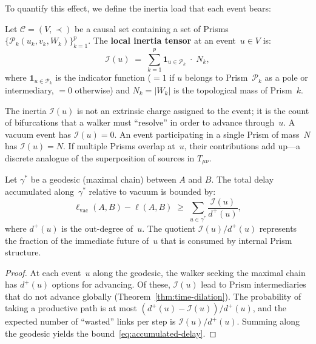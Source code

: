 To quantify this effect, we define the inertia load that each event
bears:

\begin{definition}
\label{def:inertia-tensor}
Let $\mathcal{C} = (V, \prec)$ be a causal set containing a set of
Prisms
$\{\mathcal{P}_k(u_k, v_k, W_k)\}_{k=1}^{p}$. The \textbf{local
inertia tensor} at an event~$u \in V$ is:
\begin{equation}
  \mathcal{I}(u)
  \;=\;
  \sum_{k=1}^{p} \mathbf{1}_{u \in \mathcal{P}_k} \;\cdot\; N_k,
  \label{eq:inertia-tensor}
\end{equation}
where $\mathbf{1}_{u \in \mathcal{P}_k}$ is the indicator function
($= 1$ if $u$ belongs to Prism~$\mathcal{P}_k$ as a pole or
intermediary, $= 0$ otherwise) and $N_k = |W_k|$ is the topological
mass of Prism~$k$.
\end{definition}


\noindent
The inertia $\mathcal{I}(u)$ is not an extrinsic charge assigned to
the event; it is the count of bifurcations that a walker must
``resolve'' in order to advance through~$u$. A vacuum event has
$\mathcal{I}(u) = 0$. An event participating in a single Prism of
mass~$N$ has $\mathcal{I}(u) = N$. If multiple Prisms overlap at~$u$,
their contributions add up---a discrete analogue of the superposition
of sources in $T_{\mu\nu}$.

\begin{theorem}
\label{thm:accumulated-delay}
Let $\gamma^*$ be a geodesic (maximal chain) between $A$ and $B$. The
total delay accumulated along~$\gamma^*$ relative to vacuum is bounded
by:
\begin{equation}
  \ell_{\text{vac}}(A,B) - \ell(A,B)
  \;\geq\;
  \sum_{u \in \gamma^*} \frac{\mathcal{I}(u)}{d^+(u)},
  \label{eq:accumulated-delay}
\end{equation}
where $d^+(u)$ is the out-degree of~$u$. The quotient
$\mathcal{I}(u)/d^+(u)$ represents the fraction of the immediate
future of~$u$ that is consumed by internal Prism structure.
\end{theorem}

\begin{proof}
At each event~$u$ along the geodesic, the walker seeking the maximal
chain has $d^+(u)$ options for advancing. Of these, $\mathcal{I}(u)$
lead to Prism intermediaries that do not advance globally
(Theorem~\ref{thm:time-dilation}). The probability of taking a
productive path is at most
$(d^+(u) - \mathcal{I}(u))/d^+(u)$, and the expected number of
``wasted'' links per step is $\mathcal{I}(u)/d^+(u)$. Summing along
the geodesic yields the bound~\eqref{eq:accumulated-delay}.
\end{proof}

